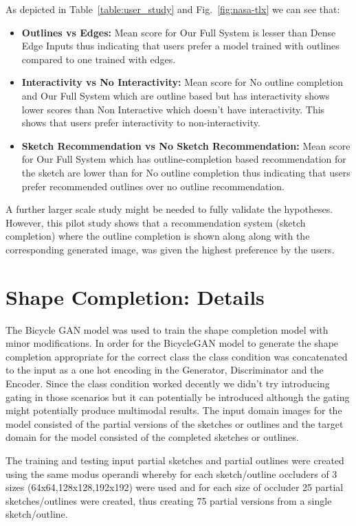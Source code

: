 \documentclass[10pt,twocolumn,letterpaper]{article}
\def\figref#1{Fig.~\ref{#1}}
\def\tabref#1{Table~\ref{#1}}
\begin{document}
As depicted in \tabref{table:user_study} and \figref{fig:nasa-tlx} we can see that:

\begin{itemize}
    \item \textbf{Outlines vs Edges:} Mean score for Our Full System is lesser than Dense Edge Inputs thus indicating that users prefer a model trained with outlines compared to one trained with edges.
    \item \textbf{Interactivity vs No Interactivity:} Mean score for No outline completion and Our Full System which are outline based but has interactivity shows lower scores than Non Interactive which doesn't have interactivity. This shows that users prefer interactivity to non-interactivity.
    \item \textbf{Sketch Recommendation vs No Sketch Recommendation:} Mean score for Our Full System which has outline-completion based recommendation for the sketch are lower than for No outline completion thus indicating that users prefer recommended outlines over no outline recommendation.
\end{itemize}

A further larger scale study might be needed to fully validate the hypotheses. However, this pilot study shows that a recommendation system (sketch completion) where the outline completion is shown along along with the corresponding generated image, was given the highest preference by the users.



\section{Shape Completion: Details}

The Bicycle GAN model \cite{zhu2017toward} was used to train the shape completion model with minor modifications. In order for the BicycleGAN model to generate the shape completion appropriate for the correct class the class condition was concatenated to the input as a one hot encoding in the Generator, Discriminator and the Encoder. Since the class condition worked decently we didn't try introducing gating in those scenarios but it can potentially be introduced although the gating might potentially produce multimodal results. The input domain images for the model consisted of the partial versions of the sketches or outlines and the target domain for the model consisted of the completed sketches or outlines. 

The training and testing input partial sketches and partial outlines were created using the same modus operandi whereby for each sketch/outline occluders of 3 sizes (64x64,128x128,192x192) were used and for each size of occluder 25 partial sketches/outlines were created, thus creating 75 partial versions from a single sketch/outline.
\end{document}
